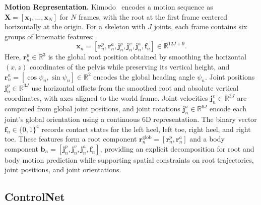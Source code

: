 \textbf{Motion Representation.} Kimodo~\citep{kimodo} encodes a motion sequence as $\mathbf{X}=[\mathbf{x}_1,\ldots,\mathbf{x}_N]$ for $N$ frames, with the root at the first frame centered horizontally at the origin. For a skeleton with $J$ joints, each frame contains six groups of kinematic features:
\begin{equation}
  \mathbf{x}_n = [\mathbf{r}^{p}_n,\mathbf{r}^{a}_n,\mathbf{j}^{p}_n,\mathbf{j}^{v}_n,\mathbf{j}^{a}_n,\mathbf{f}_n]
  \in \mathbb{R}^{12J+9}.
  \label{eq:kimodo_motion_representation}
\end{equation}
Here, $\mathbf{r}^{p}_n\in\mathbb{R}^{3}$ is the global root position obtained by smoothing the horizontal $(x,z)$ coordinates of the pelvis while preserving its vertical height, and $\mathbf{r}^{a}_n=[\cos\psi_n,\sin\psi_n]\in\mathbb{R}^{2}$ encodes the global heading angle $\psi_n$. Joint positions $\mathbf{j}^{p}_n\in\mathbb{R}^{3J}$ use horizontal offsets from the smoothed root and absolute vertical coordinates, with axes aligned to the world frame. Joint velocities $\mathbf{j}^{v}_n\in\mathbb{R}^{3J}$ are computed from global joint positions, and joint rotations $\mathbf{j}^{a}_n\in\mathbb{R}^{6J}$ encode each joint's global orientation using a continuous 6D representation. The binary vector $\mathbf{f}_n\in\{0,1\}^{4}$ records contact states for the left heel, left toe, right heel, and right toe. These features form a root component $\mathbf{r}^{\mathrm{glob}}_n=[\mathbf{r}^{p}_n,\mathbf{r}^{a}_n]$ and a body component $\mathbf{b}_n=[\mathbf{j}^{p}_n,\mathbf{j}^{v}_n,\mathbf{j}^{a}_n,\mathbf{f}_n]$, providing an explicit decomposition for root and body motion prediction while supporting spatial constraints on root trajectories, joint positions, and joint orientations.

\subsection{ControlNet}
\label{sec:prelim_controlnet}

